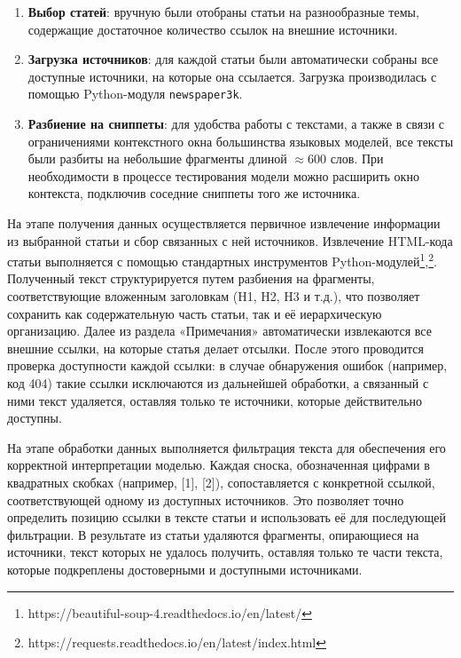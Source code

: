 \documentclass{article}
\theoremstyle{definition}
\theoremstyle{plain}
\begin{document}
\begin{enumerate}

    \item \textbf{Выбор статей}: вручную были отобраны статьи на разнообразные темы, содержащие достаточное количество ссылок на внешние источники.
    
    \item \textbf{Загрузка источников}: для каждой статьи были автоматически собраны все доступные источники, на которые она ссылается. Загрузка производилась с помощью Python-модуля \texttt{newspaper3k}.
    
    \item \textbf{Разбиение на сниппеты}: для удобства работы с текстами, а также в связи с ограничениями контекстного окна большинства языковых моделей, все тексты были разбиты на небольшие фрагменты длиной $\approx 600$ слов. При необходимости в процессе тестирования модели можно расширить окно контекста, подключив соседние сниппеты того же источника.

\end{enumerate}

На этапе получения данных осуществляется первичное извлечение информации из выбранной статьи и сбор связанных с ней источников. 
Извлечение HTML-кода статьи выполняется с помощью стандартных инструментов Python-модулей\footnote{https://beautiful-soup-4.readthedocs.io/en/latest/},\footnote{https://requests.readthedocs.io/en/latest/index.html}. 
Полученный текст структурируется путем разбиения на фрагменты, соответствующие вложенным заголовкам (H1, H2, H3 и т.д.), что позволяет сохранить как содержательную часть статьи, так и её иерархическую организацию. 
Далее из раздела «Примечания» автоматически извлекаются все внешние ссылки, на которые статья делает отсылки. После этого проводится проверка доступности каждой ссылки: в случае обнаружения ошибок (например, код 404) такие ссылки исключаются из дальнейшей обработки, а связанный с ними текст удаляется, оставляя только те источники, которые действительно доступны.

На этапе обработки данных выполняется фильтрация текста для обеспечения его корректной интерпретации моделью. 
Каждая сноска, обозначенная цифрами в квадратных скобках (например, [1], [2]), сопоставляется с конкретной ссылкой, соответствующей одному из доступных источников. 
Это позволяет точно определить позицию ссылки в тексте статьи и использовать её для последующей фильтрации. 
В результате из статьи удаляются фрагменты, опирающиеся на источники, текст которых не удалось получить, оставляя только те части текста, которые подкреплены достоверными и доступными источниками.
\end{document}
